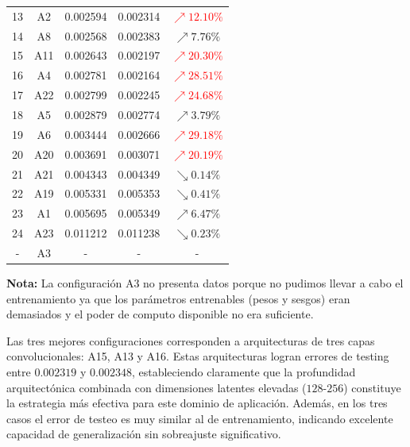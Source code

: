 \begin{table}[htbp]
\begin{tabular}{|c|c|c|c|c|}
13 & A2 & 0.002594 & 0.002314 & \textcolor{red}{$\nearrow 12.10\%$} \\
14 & A8 & 0.002568 & 0.002383 & \textcolor{rojito}{$\nearrow 7.76\%$} \\
15 & A11 & 0.002643 & 0.002197 & \textcolor{red}{$\nearrow 20.30\%$} \\
16 & A4 & 0.002781 & 0.002164 & \textcolor{red}{$\nearrow 28.51\%$} \\
17 & A22 & 0.002799 & 0.002245 & \textcolor{red}{$\nearrow 24.68\%$} \\
18 & A5 & 0.002879 & 0.002774 & \textcolor{rojito}{$\nearrow 3.79\%$} \\
19 & A6 & 0.003444 & 0.002666 & \textcolor{red}{$\nearrow 29.18\%$} \\
20 & A20 & 0.003691 & 0.003071 & \textcolor{red}{$\nearrow 20.19\%$} \\
21 & A21 & 0.004343 & 0.004349 & \textcolor{verdecito}{$\searrow 0.14\%$} \\
22 & A19 & 0.005331 & 0.005353 & \textcolor{verdecito}{$\searrow 0.41\%$} \\
23 & A1 & 0.005695 & 0.005349 & \textcolor{rojito}{$\nearrow 6.47\%$} \\
24 & A23 & 0.011212 & 0.011238 & \textcolor{verdecito}{$\searrow 0.23\%$} \\
\hline
- & A3 & - & - & - \\
\hline
\end{tabular}

\vspace{0.5cm}

\begin{flushleft}
\footnotesize
\textbf{Nota:}
La configuración A3 no presenta datos porque no pudimos llevar a cabo el entrenamiento ya que los parámetros entrenables (pesos y sesgos) eran demasiados y el poder de computo disponible no era suficiente.
\end{flushleft}
\end{table}


Las tres mejores configuraciones corresponden a arquitecturas de tres capas convolucionales: A15, A13 y A16. Estas arquitecturas logran errores de testing entre $0.002319$ y $0.002348$, estableciendo claramente que la profundidad arquitectónica combinada con dimensiones latentes elevadas ($128$-$256$) constituye la estrategia más efectiva para este dominio de aplicación. Además, en los tres casos el error de testeo es muy similar al de entrenamiento, indicando excelente capacidad de generalización sin sobreajuste significativo.

